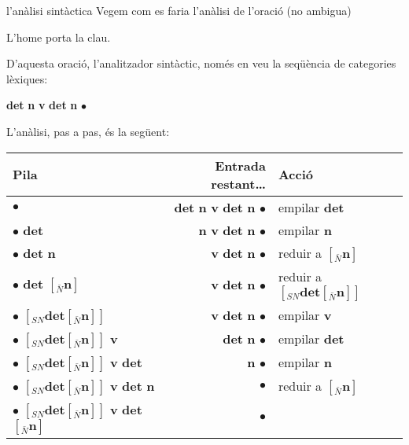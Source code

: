 \begin{persabermes}{l'anàlisi sintàctica}
  Vegem com es faria l'anàlisi de l'oració (no ambigua)
  \begin{example}
    L'home porta la clau.
  \end{example}
  D'aquesta oració, l'analitzador sintàctic, només en veu la seqüència
  de categories lèxiques:
  \begin{example}
    \textbf{det} \textbf{n} \textbf{v} \textbf{det} \textbf{n}
    \mbox{$\bullet$}
  \end{example}
  L'anàlisi, pas a pas, és la següent:
  \begin{center}
    \begin{tabular}{l|r|l}
      \hline
      Pila & Entrada restant\ldots & Acció  \\
      \hline
      $\bullet$             
      & 
      \textbf{det} \textbf{n} \textbf{v} \textbf{det} \textbf{n} $\bullet$
      & 
      empilar \textbf{det} 
      \\
      $\bullet$ \textbf{det}
      & 
      \textbf{n} \textbf{v} \textbf{det} \textbf{n} $\bullet$
      & 
      empilar \textbf{n} 
      \\
      $\bullet$ \textbf{det} \textbf{n}
      & 
      \textbf{v} \textbf{det} \textbf{n} $\bullet$
      & 
      reduir a $[_{\bar{N}} \mathbf{n} ]$
      \\
      $\bullet$ \textbf{det} $[_{\bar{N}} \textbf{n} ]$
      & 
      \textbf{v} \textbf{det} \textbf{n} $\bullet$
      & 
      reduir a $[_{SN} \textbf{det} [_{\bar{N}} \mathbf{n} ] ]$
      \\
      $\bullet$ $[_{SN} \textbf{det} [_{\bar{N}} \textbf{n} ] ]$
      & 
      \textbf{v} \textbf{det} \textbf{n} $\bullet$
      & 
      empilar \textbf{v}
      \\
      $\bullet$ $[_{SN} \textbf{det} [_{\bar{N}} \textbf{n} ] ]$ \textbf{v}
      & 
      \textbf{det} \textbf{n} $\bullet$
      & 
      empilar \textbf{det}
      \\
      $\bullet$ $[_{SN} \textbf{det} [_{\bar{N}} \textbf{n} ] ]$
      \textbf{v} \textbf{det}
      & 
      \textbf{n} $\bullet$
      & 
      empilar \textbf{n}
      \\
      $\bullet$ $[_{SN} \textbf{det} [_{\bar{N}} \textbf{n} ] ]$
      \textbf{v} \textbf{det} \textbf{n}
      & 
      $\bullet$
      & 
      reduir a $[_{\bar{N}} \mathbf{n} ]$
      \\
      $\bullet$ $[_{SN} \textbf{det} [_{\bar{N}} \textbf{n} ] ]$
      \textbf{v} \textbf{det} $[_{\bar{N}} \textbf{n} ]$
      & 
      $\bullet$
      & 

\end{tabular}
\end{center}
\end{persabermes}
